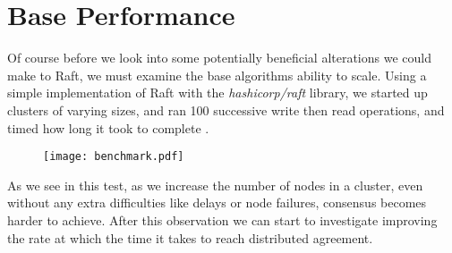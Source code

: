 \section{Base Performance}

Of course before we look into some potentially beneficial alterations we could make to Raft, we must examine the base algorithms ability to scale. Using a simple implementation of Raft with the \textit{hashicorp/raft} library, we started up clusters of varying sizes, and ran 100 successive write then read operations, and timed how long it took to complete \cite{HashicorpRaft}.

\begin{figure}[h]
\centering
\texttt{[image: benchmark.pdf]}
\end{figure}

As we see in this test, as we increase the number of nodes in a cluster, even without any extra difficulties like delays or node failures, consensus becomes harder to achieve. After this observation we can start to investigate improving the rate at which the time it takes to reach distributed agreement.